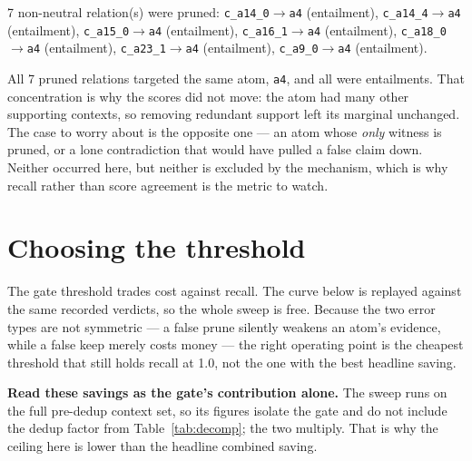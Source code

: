 \documentclass[11pt]{article}
\begin{document}
7 non-neutral relation(s) were pruned: \texttt{c\_a14\_0}$\to$\texttt{a4} (entailment), \texttt{c\_a14\_4}$\to$\texttt{a4} (entailment), \texttt{c\_a15\_0}$\to$\texttt{a4} (entailment), \texttt{c\_a16\_1}$\to$\texttt{a4} (entailment), \texttt{c\_a18\_0}$\to$\texttt{a4} (entailment), \texttt{c\_a23\_1}$\to$\texttt{a4} (entailment), \texttt{c\_a9\_0}$\to$\texttt{a4} (entailment).

All 7 pruned relations targeted the same atom, \texttt{a4}, and all were entailments. That concentration is why the scores did not move: the atom had many other supporting contexts, so removing redundant support left its marginal unchanged. The case to worry about is the opposite one --- an atom whose \emph{only} witness is pruned, or a lone contradiction that would have pulled a false claim down. Neither occurred here, but neither is excluded by the mechanism, which is why recall rather than score agreement is the metric to watch.

\section{Choosing the threshold}
\label{sec:threshold}
The gate threshold trades cost against recall. The curve below is replayed against the same recorded verdicts, so the whole sweep is free. Because the two error types are not symmetric --- a false prune silently weakens an atom's evidence, while a false keep merely costs money --- the right operating point is the cheapest threshold that still holds recall at 1.0, not the one with the best headline saving.

\textbf{Read these savings as the gate's contribution alone.} The sweep runs on the full pre-dedup context set, so its figures isolate the gate and do not include the dedup factor from Table~\ref{tab:decomp}; the two multiply. That is why the ceiling here is lower than the headline combined saving.
\end{document}
